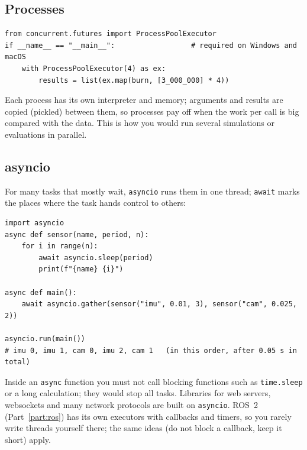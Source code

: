 \subsection*{Processes}
\begin{verbatim}
from concurrent.futures import ProcessPoolExecutor
if __name__ == "__main__":                  # required on Windows and macOS
    with ProcessPoolExecutor(4) as ex:
        results = list(ex.map(burn, [3_000_000] * 4))
\end{verbatim}
Each process has its own interpreter and memory; arguments and results are copied (pickled) between them, so processes pay off when the work per call is big compared with the data. This is how you would run several simulations or evaluations in parallel.

\subsection*{asyncio}
For many tasks that mostly wait, \texttt{asyncio} runs them in one thread; \texttt{await} marks the places where the task hands control to others:
\begin{verbatim}
import asyncio
async def sensor(name, period, n):
    for i in range(n):
        await asyncio.sleep(period)
        print(f"{name} {i}")

async def main():
    await asyncio.gather(sensor("imu", 0.01, 3), sensor("cam", 0.025, 2))

asyncio.run(main())
# imu 0, imu 1, cam 0, imu 2, cam 1   (in this order, after 0.05 s in total)
\end{verbatim}
Inside an \texttt{async} function you must not call blocking functions such as \texttt{time.sleep} or a long calculation; they would stop all tasks. Libraries for web servers, websockets and many network protocols are built on \texttt{asyncio}. ROS~2 (Part~\ref{part:ros}) has its own executors with callbacks and timers, so you rarely write threads yourself there; the same ideas (do not block a callback, keep it short) apply.


